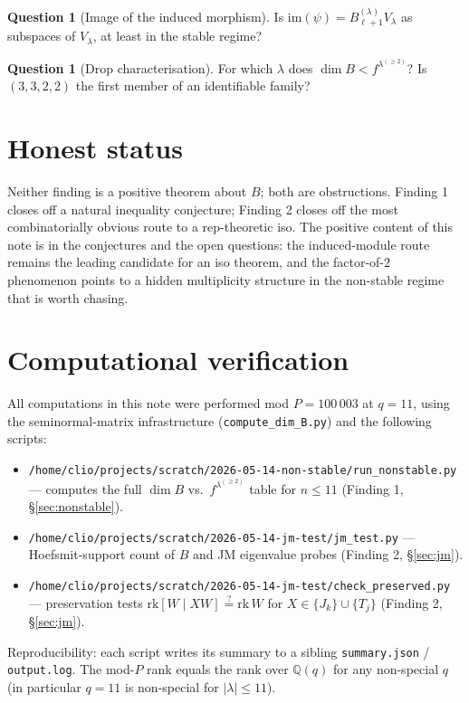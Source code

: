 \documentclass[11pt]{article}
\theoremstyle{definition}
\newtheorem{question}[theorem]{Question}
\begin{document}
\begin{question}[Image of the induced morphism]
Is $\mathrm{im}(\psi) = B_{\ell+1}^{(\lambda)} V_\lambda$ as subspaces of
$V_\lambda$, at least in the stable regime?
\end{question}

\begin{question}[Drop characterisation]
For which $\lambda$ does $\dim B < f^{\lambda^{(\ge 2)}}$? Is
$(3,3,2,2)$ the first member of an identifiable family?
\end{question}

\section{Honest status}\label{sec:status}

Neither finding is a positive theorem about $B$; both are obstructions.
Finding 1 closes off a natural inequality conjecture; Finding 2 closes
off the most combinatorially obvious route to a rep-theoretic iso. The
positive content of this note is in the conjectures and the open
questions: the induced-module route remains the leading candidate for
an iso theorem, and the factor-of-$2$ phenomenon points to a hidden
multiplicity structure in the non-stable regime that is worth chasing.

\appendix
\section{Computational verification}\label{app:scripts}

All computations in this note were performed mod $P = 100\,003$ at
$q = 11$, using the seminormal-matrix infrastructure
(\texttt{compute\_dim\_B.py}) and the following scripts:

\begin{itemize}[leftmargin=2em,topsep=0.2em,itemsep=0.1em]
\item \texttt{/home/clio/projects/scratch/2026-05-14-non-stable/run\_nonstable.py}
  --- computes the full $\dim B$ vs.\ $f^{\lambda^{(\ge 2)}}$ table for
  $n \le 11$ (Finding 1, \S\ref{sec:nonstable}).
\item \texttt{/home/clio/projects/scratch/2026-05-14-jm-test/jm\_test.py}
  --- Hoefsmit-support count of $B$ and JM eigenvalue probes
  (Finding 2, \S\ref{sec:jm}).
\item \texttt{/home/clio/projects/scratch/2026-05-14-jm-test/check\_preserved.py}
  --- preservation tests $\mathrm{rk}[W \mid XW] \stackrel{?}{=} \mathrm{rk}\,W$
  for $X \in \{J_k\} \cup \{T_j\}$ (Finding 2, \S\ref{sec:jm}).
\end{itemize}

Reproducibility: each script writes its summary to a sibling
\texttt{summary.json} / \texttt{output.log}. The mod-$P$ rank equals
the rank over $\mathbb{Q}(q)$ for any non-special $q$ (in particular
$q = 11$ is non-special for $|\lambda| \le 11$).
\end{document}
